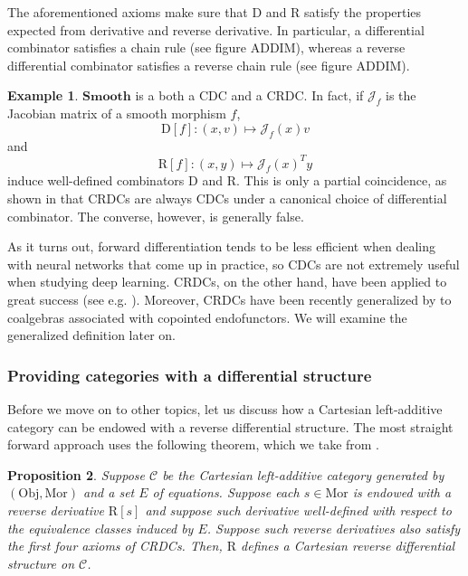 \documentclass[12pt,a4paper,openright,twoside]{report}
\theoremstyle{plain}
\newtheorem{proposition}{Proposition}
\theoremstyle{definition}
\newtheorem{example}[proposition]{Example}
\begin{document}
The aforementioned axioms make sure that $\mathrm{D}$ and $\mathrm{R}$ satisfy the properties expected from derivative and reverse derivative. In particular, a differential combinator satisfies a chain rule (see figure ADDIM), whereas a reverse differential combinator satisfies a reverse chain rule (see figure ADDIM).


\begin{example}
  $\mathbf{Smooth}$ is a both a CDC and a CRDC. In fact, if $\mathcal{J}_f$ is the Jacobian matrix of a smooth morphism $f$,
  \[\mathrm{D}[f]: (x,v) \mapsto \mathcal{J}_f(x)v\]
  and
  \[\mathrm{R}[f]: (x,y) \mapsto \mathcal{J}_f(x)^Ty\]
  induce well-defined combinators $\mathrm{D}$ and $\mathrm{R}$. This is only a partial coincidence, as shown in \cite{cockett2019reverse} that CRDCs are always CDCs under a canonical choice of differential combinator. The converse, however, is generally false.
\end{example}


As it turns out, forward differentiation tends to be less efficient when dealing with neural networks that come up in practice, so CDCs are not extremely useful when studying deep learning. CRDCs, on the other hand, have been applied to great success (see e.g. \cite{cruttwell2022categorical}). Moreover, CRDCs have been recently generalized by \cite{gavranovic2024fundamental} to coalgebras associated with copointed endofunctors. We will examine the generalized definition later on.


\subsubsection{Providing categories with a differential structure}


Before we move on to other topics, let us discuss how a Cartesian left-additive category can be endowed with a reverse differential structure. The most straight forward approach uses the following theorem, which we take from \cite{wilson2022categories}.

\begin{proposition}
  \label{prop: crdcfromgen}
  Suppose $\mathcal{C}$ be the Cartesian left-additive category generated by $(\mathrm{Obj}, \mathrm{Mor})$ and a set $E$ of equations. Suppose each $s \in \mathrm{Mor}$ is endowed with a reverse derivative $\mathrm{R}[s]$ and suppose such derivative well-defined with respect to the equivalence classes induced by $E$. Suppose such reverse derivatives also satisfy the first four axioms of CRDCs. Then, $\mathrm{R}$ defines a Cartesian reverse differential structure on $\mathcal{C}$.
\end{proposition}
\end{document}
